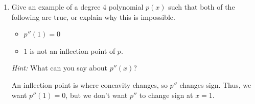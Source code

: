 \documentclass{article}
\theoremstyle{theorem}
\begin{document}
\begin{enumerate}
\begin{enumerate}
    \begin{solution}
      This is . If $p(x)$ is a degree 6 polynomial, then $\displaystyle \lim_{x \to -\infty} p(x) = \lim_{x \to \infty} p(x) = \pm \infty$. Therefore, it's impossible for $p(x)$ to pass the horizontal line test. Here are two examples of degree 6 polynomials:
      \begin{center}
        \hspace{0.25in}
      \end{center}
    \end{solution}

  \item
    \begin{problem}[\vfill\newpage]
      Give an example of a degree 4 polynomial $p(x)$ such that both of the following are true, or explain why this is impossible.
      \begin{itemize}[nosep]
      \item $p''(1) = 0$
      \item $1$ is not an inflection point of $p$.
      \end{itemize}
      \emph{Hint:} What can you say about $p''(x)$? 
    \end{problem}

    \begin{solution}
      An inflection point is where concavity changes, so $p''$ changes sign. Thus, we want $p''(1) = 0$, but we don't want $p''$ to change sign at $x = 1$.


\end{solution}
\end{enumerate}
\end{enumerate}
\end{document}
